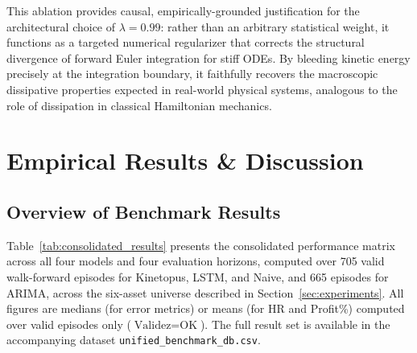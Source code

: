 \documentclass[11pt,a4paper]{article}
\begin{document}
This ablation provides causal, empirically-grounded justification for the architectural choice of $\lambda = 0.99$: rather than an arbitrary statistical weight, it functions as a targeted numerical regularizer that corrects the structural divergence of forward Euler integration for stiff ODEs. By bleeding kinetic energy precisely at the integration boundary, it faithfully recovers the macroscopic dissipative properties expected in real-world physical systems, analogous to the role of dissipation in classical Hamiltonian mechanics.

\section{Empirical Results \& Discussion}
\label{sec:results}

\subsection{Overview of Benchmark Results}

Table~\ref{tab:consolidated_results} presents the consolidated performance matrix across all four models and four evaluation horizons, computed over 705 valid walk-forward episodes for Kinetopus, LSTM, and Naive, and 665 episodes for ARIMA, across the six-asset universe described in Section~\ref{sec:experiments}. All figures are medians (for error metrics) or means (for HR and Profit\%) computed over valid episodes only ($\text{Validez} = \text{OK}$). The full result set is available in the accompanying dataset \texttt{unified\_benchmark\_db.csv}.
\end{document}
